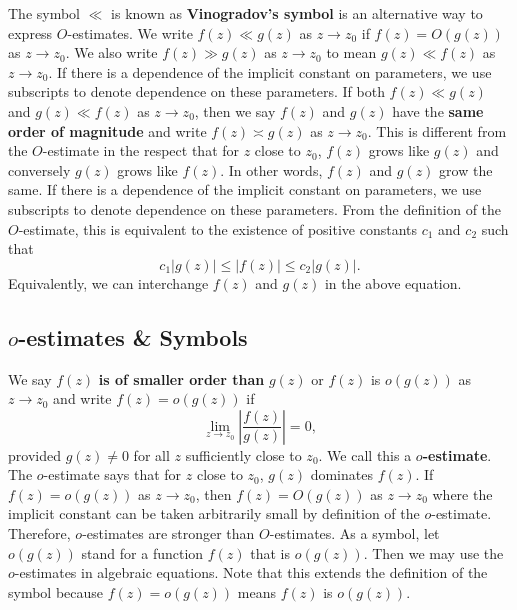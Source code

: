         The symbol $\ll$ is known as \textbf{Vinogradov's symbol} is an alternative way to express $O$-estimates. We write $f(z) \ll g(z)$ as $z \to z_{0}$ if $f(z) = O(g(z))$ as $z \to z_{0}$. We also write $f(z) \gg g(z)$ as $z \to z_{0}$ to mean $g(z) \ll f(z)$ as $z \to z_{0}$. If there is a dependence of the implicit constant on parameters, we use subscripts to denote dependence on these parameters. If both $f(z) \ll g(z)$ and $g(z) \ll f(z)$ as $z \to z_{0}$, then we say $f(z)$ and $g(z)$ have the \textbf{same order of magnitude} and write $f(z) \asymp g(z)$ as $z \to z_{0}$. This is different from the $O$-estimate in the respect that for $z$ close to $z_{0}$, $f(z)$ grows like $g(z)$ and conversely $g(z)$ grows like $f(z)$. In other words, $f(z)$ and $g(z)$ grow the same. If there is a dependence of the implicit constant on parameters, we use subscripts to denote dependence on these parameters. From the definition of the $O$-estimate, this is equivalent to the existence of positive constants $c_{1}$ and $c_{2}$ such that
        \[
          c_{1}|g(z)| \le |f(z)| \le c_{2}|g(z)|.
        \]
        Equivalently, we can interchange $f(z)$ and $g(z)$ in the above equation.
      \subsection*{\texorpdfstring{$o$}{o}-estimates \& Symbols}
        We say $f(z)$ \textbf{is of smaller order than} $g(z)$ or $f(z)$ is $o(g(z))$ as $z \to z_{0}$ and write $f(z) = o(g(z))$ if
        \[
          \lim_{z \to z_{0}}\left|\frac{f(z)}{g(z)}\right| = 0,
        \]
        provided $g(z) \neq 0$ for all $z$ sufficiently close to $z_{0}$. We call this a \textbf{$o$-estimate}. The $o$-estimate says that for $z$ close to $z_{0}$, $g(z)$ dominates $f(z)$. If $f(z) = o(g(z))$ as $z \to z_{0}$, then $f(z) = O(g(z))$ as $z \to z_{0}$ where the implicit constant can be taken arbitrarily small by definition of the $o$-estimate. Therefore, $o$-estimates are stronger than $O$-estimates. As a symbol, let $o(g(z))$ stand for a function $f(z)$ that is $o(g(z))$. Then we may use the $o$-estimates in algebraic equations. Note that this extends the definition of the symbol because $f(z) = o(g(z))$ means $f(z)$ is $o(g(z))$.

